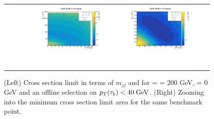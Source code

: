 \begin{figure}[tbh!]
	\centering
	\begin{tabular}{cc}
		\includegraphics[width=0.45\textwidth]{analysis/pics/JetInvMass_vs_MET_xsec_chi200_lsp000_taupt40.pdf}
		\includegraphics[width=0.45\textwidth]{analysis/pics/JetInvMass_vs_MET_xsec_chi200_lsp000_taupt40_zoom.pdf} 		
	\end{tabular}
	\caption{(Left) Cross section limit in terms of $m_{jj}$ and \met for \charginopm = \neutralinotwo = 200 GeV, \neutralinoone = 0 GeV and an offline selection on $p_{\text{T}}(\tau_{\text{h}}) <  40\;\text{Ge}\kern-0.06667em\text{V}$. (Right) Zooming into the minimum cross section limit area for the same benchmark point.}
	\label{fig::JetInvMass_vs_MET_xsec_chi200_lsp000_taupt40}
\end{figure}

